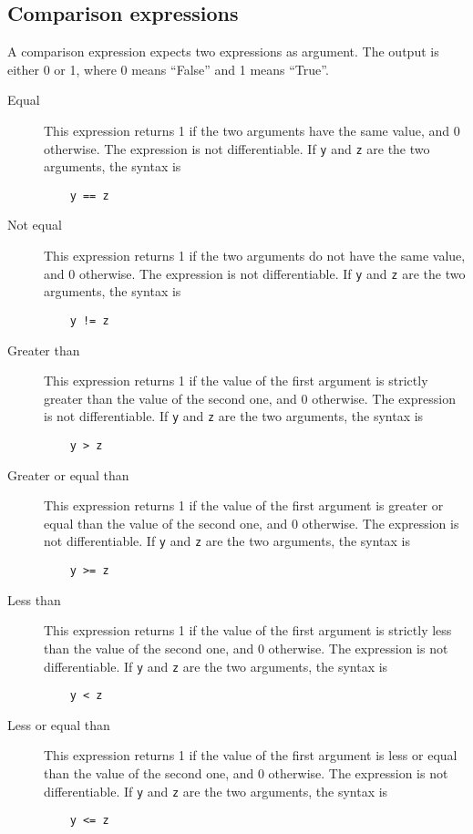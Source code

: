 \documentclass[12pt,a4paper]{article}
\begin{document}
\subsection{Comparison expressions}
A comparison expression expects two expressions as argument. The output  is either 0 or 1, where 0 means ``False'' and 1 means ``True''. 
  

\begin{description}
\item[Equal] This expression returns 1 if the two arguments have the same value, and 0 otherwise.
  The expression is not differentiable. If \lstinline+y+ and \lstinline+z+ are the two arguments,  the syntax is
  \begin{lstlisting}
    y == z
  \end{lstlisting}

\item[Not equal] This expression returns 1 if the two arguments do not have the same value, and 0 otherwise.
  The expression is not differentiable. If \lstinline+y+ and \lstinline+z+ are the two arguments,  the syntax is
  \begin{lstlisting}
    y != z
  \end{lstlisting}

\item[Greater than] This expression returns 1 if the value of the first argument is strictly greater than the value of the second one, and 0 otherwise.
  The expression is not differentiable. If \lstinline+y+ and \lstinline+z+ are the two arguments,  the syntax is
  \begin{lstlisting}
    y > z
  \end{lstlisting}

\item[Greater or equal than] This expression returns 1 if the value of the first argument is greater or equal than the value of the second one, and 0 otherwise.
  The expression is not differentiable. If \lstinline+y+ and \lstinline+z+ are the two arguments,  the syntax is
  \begin{lstlisting}
    y >= z
  \end{lstlisting}

\item[Less than] This expression returns 1 if the value of the first argument is strictly less than the value of the second one, and 0 otherwise.
  The expression is not differentiable. If \lstinline+y+ and \lstinline+z+ are the two arguments,  the syntax is
  \begin{lstlisting}
    y < z
  \end{lstlisting}

\item[Less or equal than] This expression returns 1 if the value of the first argument is less or equal than the value of the second one, and 0 otherwise.
  The expression is not differentiable. If \lstinline+y+ and \lstinline+z+ are the two arguments,  the syntax is
  \begin{lstlisting}
    y <= z
  \end{lstlisting}
\end{description}
\end{document}
